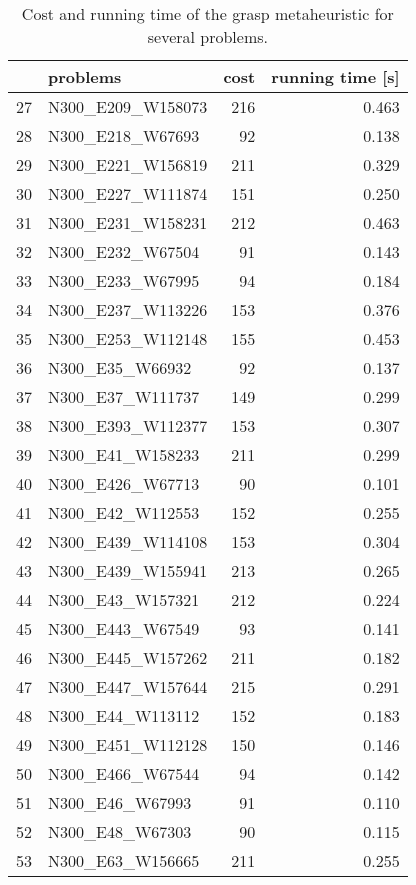 \begin{table}[H]
\centering
\begin{tabular}{llrr}
\toprule
{} &            problems &  cost &  running time [s] \\
\midrule
27 &   N300\_E209\_W158073 &   216 &             0.463 \\
28 &    N300\_E218\_W67693 &    92 &             0.138 \\
29 &   N300\_E221\_W156819 &   211 &             0.329 \\
30 &   N300\_E227\_W111874 &   151 &             0.250 \\
31 &   N300\_E231\_W158231 &   212 &             0.463 \\
32 &    N300\_E232\_W67504 &    91 &             0.143 \\
33 &    N300\_E233\_W67995 &    94 &             0.184 \\
34 &   N300\_E237\_W113226 &   153 &             0.376 \\
35 &   N300\_E253\_W112148 &   155 &             0.453 \\
36 &     N300\_E35\_W66932 &    92 &             0.137 \\
37 &    N300\_E37\_W111737 &   149 &             0.299 \\
38 &   N300\_E393\_W112377 &   153 &             0.307 \\
39 &    N300\_E41\_W158233 &   211 &             0.299 \\
40 &    N300\_E426\_W67713 &    90 &             0.101 \\
41 &    N300\_E42\_W112553 &   152 &             0.255 \\
42 &   N300\_E439\_W114108 &   153 &             0.304 \\
43 &   N300\_E439\_W155941 &   213 &             0.265 \\
44 &    N300\_E43\_W157321 &   212 &             0.224 \\
45 &    N300\_E443\_W67549 &    93 &             0.141 \\
46 &   N300\_E445\_W157262 &   211 &             0.182 \\
47 &   N300\_E447\_W157644 &   215 &             0.291 \\
48 &    N300\_E44\_W113112 &   152 &             0.183 \\
49 &   N300\_E451\_W112128 &   150 &             0.146 \\
50 &    N300\_E466\_W67544 &    94 &             0.142 \\
51 &     N300\_E46\_W67993 &    91 &             0.110 \\
52 &     N300\_E48\_W67303 &    90 &             0.115 \\
53 &    N300\_E63\_W156665 &   211 &             0.255 \\
\bottomrule
\end{tabular}
\caption{Cost and running time of the grasp metaheuristic for several problems.}
\label{table:grasp-medium-results-II}
\end{table}

